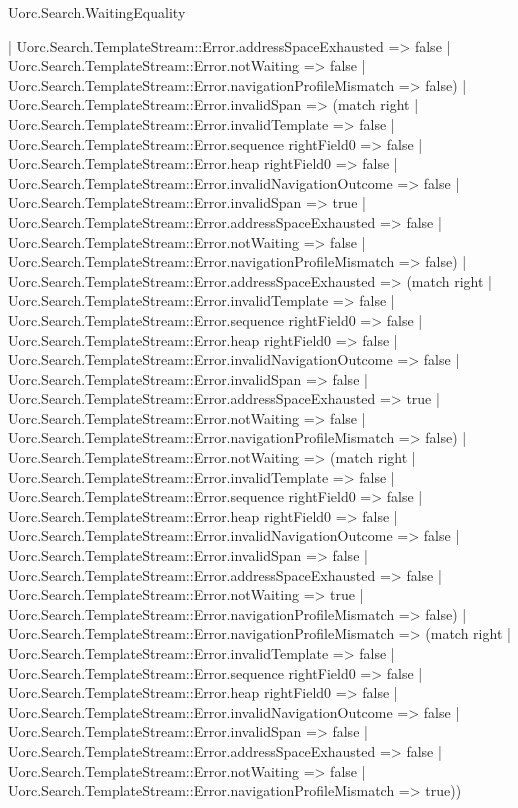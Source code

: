 \begin{lexlean}{Uorc.Search.WaitingEquality}
\begin{semanticmodule}
{      | Uorc.Search.TemplateStream::Error.addressSpaceExhausted => false
      | Uorc.Search.TemplateStream::Error.notWaiting => false
      | Uorc.Search.TemplateStream::Error.navigationProfileMismatch => false)
    | Uorc.Search.TemplateStream::Error.invalidSpan => (match right
      | Uorc.Search.TemplateStream::Error.invalidTemplate => false
      | Uorc.Search.TemplateStream::Error.sequence rightField0 => false
      | Uorc.Search.TemplateStream::Error.heap rightField0 => false
      | Uorc.Search.TemplateStream::Error.invalidNavigationOutcome => false
      | Uorc.Search.TemplateStream::Error.invalidSpan => true
      | Uorc.Search.TemplateStream::Error.addressSpaceExhausted => false
      | Uorc.Search.TemplateStream::Error.notWaiting => false
      | Uorc.Search.TemplateStream::Error.navigationProfileMismatch => false)
    | Uorc.Search.TemplateStream::Error.addressSpaceExhausted => (match right
      | Uorc.Search.TemplateStream::Error.invalidTemplate => false
      | Uorc.Search.TemplateStream::Error.sequence rightField0 => false
      | Uorc.Search.TemplateStream::Error.heap rightField0 => false
      | Uorc.Search.TemplateStream::Error.invalidNavigationOutcome => false
      | Uorc.Search.TemplateStream::Error.invalidSpan => false
      | Uorc.Search.TemplateStream::Error.addressSpaceExhausted => true
      | Uorc.Search.TemplateStream::Error.notWaiting => false
      | Uorc.Search.TemplateStream::Error.navigationProfileMismatch => false)
    | Uorc.Search.TemplateStream::Error.notWaiting => (match right
      | Uorc.Search.TemplateStream::Error.invalidTemplate => false
      | Uorc.Search.TemplateStream::Error.sequence rightField0 => false
      | Uorc.Search.TemplateStream::Error.heap rightField0 => false
      | Uorc.Search.TemplateStream::Error.invalidNavigationOutcome => false
      | Uorc.Search.TemplateStream::Error.invalidSpan => false
      | Uorc.Search.TemplateStream::Error.addressSpaceExhausted => false
      | Uorc.Search.TemplateStream::Error.notWaiting => true
      | Uorc.Search.TemplateStream::Error.navigationProfileMismatch => false)
    | Uorc.Search.TemplateStream::Error.navigationProfileMismatch => (match right
      | Uorc.Search.TemplateStream::Error.invalidTemplate => false
      | Uorc.Search.TemplateStream::Error.sequence rightField0 => false
      | Uorc.Search.TemplateStream::Error.heap rightField0 => false
      | Uorc.Search.TemplateStream::Error.invalidNavigationOutcome => false
      | Uorc.Search.TemplateStream::Error.invalidSpan => false
      | Uorc.Search.TemplateStream::Error.addressSpaceExhausted => false
      | Uorc.Search.TemplateStream::Error.notWaiting => false
      | Uorc.Search.TemplateStream::Error.navigationProfileMismatch => true))
}


\end{semanticmodule}
\end{lexlean}
